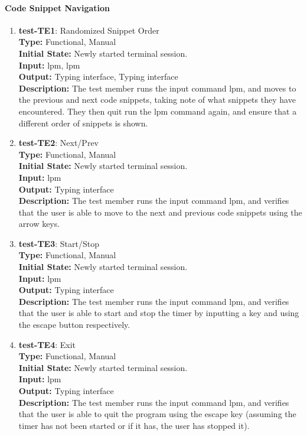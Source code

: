 \documentclass[12pt, titlepage]{article}
\begin{document}
\paragraph{Code Snippet Navigation}
\begin{enumerate}

\item{\textbf{test-TE1}: Randomized Snippet Order\\}
\textbf{Type:} Functional, Manual \\
\textbf{Initial State:} Newly started terminal session. \\
\textbf{Input:} lpm, lpm \\
\textbf{Output:} Typing interface, Typing interface  \\
\textbf{Description:} The test member runs the input command lpm, and moves to the previous and next code snippets, taking note of what snippets they have encountered. They then quit run the lpm command again, and ensure that a different order of snippets is shown. \\

\item{\textbf{test-TE2}: Next/Prev\\}
\textbf{Type:} Functional, Manual \\
\textbf{Initial State:} Newly started terminal session. \\
\textbf{Input:} lpm \\
\textbf{Output:} Typing interface  \\
\textbf{Description:} The test member runs the input command lpm, and verifies that the user is able to move to the next and previous code snippets using the arrow keys. \\

\item{\textbf{test-TE3}: Start/Stop\\}
\textbf{Type:} Functional, Manual \\
\textbf{Initial State:} Newly started terminal session. \\
\textbf{Input:} lpm \\
\textbf{Output:} Typing interface  \\
\textbf{Description:} The test member runs the input command lpm, and verifies that the user is able to start and stop the timer by inputting a key and using the escape button respectively. \\

\item{\textbf{test-TE4}: Exit\\}
\textbf{Type:} Functional, Manual \\
\textbf{Initial State:} Newly started terminal session. \\
\textbf{Input:} lpm \\
\textbf{Output:} Typing interface  \\
\textbf{Description:} The test member runs the input command lpm, and verifies that the user is able to quit the program using the escape key (assuming the timer has not been started or if it has, the user has stopped it). \\

\end{enumerate}
\end{document}
